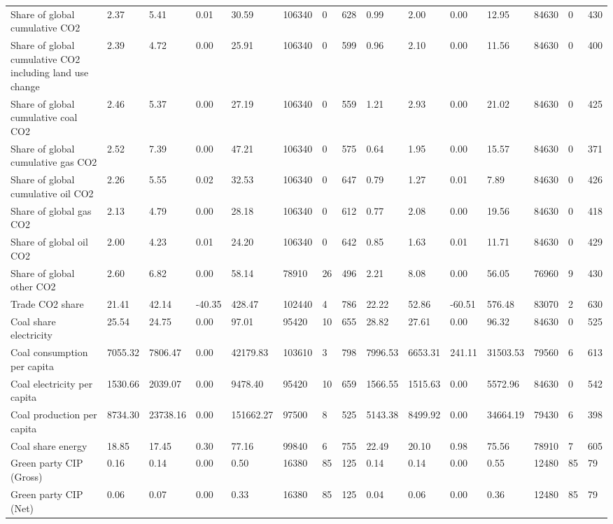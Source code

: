 \begin{longtable}{lllllllllllllll}
Share of global cumulative CO2 & 2.37 & 5.41 & 0.01 & 30.59 & 106340 & 0 & 628 & 0.99 & 2.00 & 0.00 & 12.95 & 84630 & 0 & 430\\
Share of global cumulative CO2 including land use change & 2.39 & 4.72 & 0.00 & 25.91 & 106340 & 0 & 599 & 0.96 & 2.10 & 0.00 & 11.56 & 84630 & 0 & 400\\
Share of global cumulative coal CO2 & 2.46 & 5.37 & 0.00 & 27.19 & 106340 & 0 & 559 & 1.21 & 2.93 & 0.00 & 21.02 & 84630 & 0 & 425\\
Share of global cumulative gas CO2 & 2.52 & 7.39 & 0.00 & 47.21 & 106340 & 0 & 575 & 0.64 & 1.95 & 0.00 & 15.57 & 84630 & 0 & 371\\
\addlinespace
Share of global cumulative oil CO2 & 2.26 & 5.55 & 0.02 & 32.53 & 106340 & 0 & 647 & 0.79 & 1.27 & 0.01 & 7.89 & 84630 & 0 & 426\\
Share of global gas CO2 & 2.13 & 4.79 & 0.00 & 28.18 & 106340 & 0 & 612 & 0.77 & 2.08 & 0.00 & 19.56 & 84630 & 0 & 418\\
Share of global oil CO2 & 2.00 & 4.23 & 0.01 & 24.20 & 106340 & 0 & 642 & 0.85 & 1.63 & 0.01 & 11.71 & 84630 & 0 & 429\\
Share of global other CO2 & 2.60 & 6.82 & 0.00 & 58.14 & 78910 & 26 & 496 & 2.21 & 8.08 & 0.00 & 56.05 & 76960 & 9 & 430\\
Trade CO2 share & 21.41 & 42.14 & -40.35 & 428.47 & 102440 & 4 & 786 & 22.22 & 52.86 & -60.51 & 576.48 & 83070 & 2 & 630\\
\addlinespace
Coal share electricity & 25.54 & 24.75 & 0.00 & 97.01 & 95420 & 10 & 655 & 28.82 & 27.61 & 0.00 & 96.32 & 84630 & 0 & 525\\
Coal consumption per capita & 7055.32 & 7806.47 & 0.00 & 42179.83 & 103610 & 3 & 798 & 7996.53 & 6653.31 & 241.11 & 31503.53 & 79560 & 6 & 613\\
Coal electricity per capita & 1530.66 & 2039.07 & 0.00 & 9478.40 & 95420 & 10 & 659 & 1566.55 & 1515.63 & 0.00 & 5572.96 & 84630 & 0 & 542\\
Coal production per capita & 8734.30 & 23738.16 & 0.00 & 151662.27 & 97500 & 8 & 525 & 5143.38 & 8499.92 & 0.00 & 34664.19 & 79430 & 6 & 398\\
Coal share energy & 18.85 & 17.45 & 0.30 & 77.16 & 99840 & 6 & 755 & 22.49 & 20.10 & 0.98 & 75.56 & 78910 & 7 & 605\\
\addlinespace
Green party CIP (Gross) & 0.16 & 0.14 & 0.00 & 0.50 & 16380 & 85 & 125 & 0.14 & 0.14 & 0.00 & 0.55 & 12480 & 85 & 79\\
Green party CIP (Net) & 0.06 & 0.07 & 0.00 & 0.33 & 16380 & 85 & 125 & 0.04 & 0.06 & 0.00 & 0.36 & 12480 & 85 & 79\\

\end{longtable}
